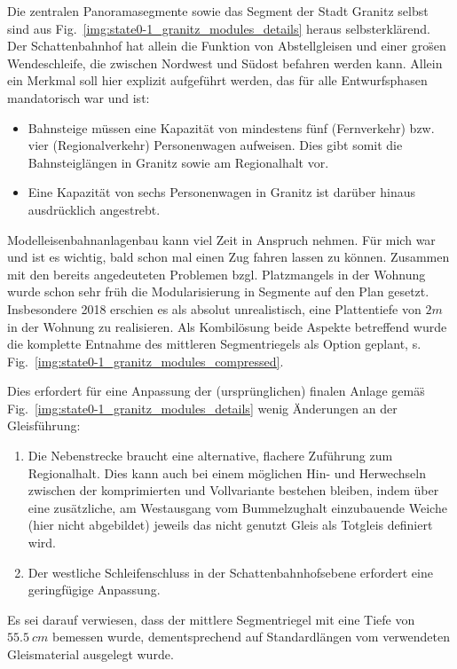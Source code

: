 Die zentralen Panoramasegmente sowie das Segment der Stadt Granitz selbst sind aus Fig.~\ref{img:state0-1_granitz_modules_details} heraus selbsterkl\"arend.
Der Schattenbahnhof hat allein die Funktion von Abstellgleisen und einer gro\"sen Wendeschleife, die zwischen Nordwest und S\"udost befahren werden kann.
Allein ein Merkmal soll hier explizit aufgef\"uhrt werden, das f\"ur alle Entwurfsphasen mandatorisch war und ist:
\begin{itemize}
	\item Bahnsteige m\"ussen eine Kapazit\"at von mindestens f\"unf (Fernverkehr) bzw. vier  (Regionalverkehr) Personenwagen aufweisen.
	Dies gibt somit die Bahnsteigl\"angen in Granitz sowie am Regionalhalt vor.
	\item Eine Kapazit\"at von sechs Personenwagen in Granitz ist dar\"uber hinaus ausdr\"ucklich angestrebt.
\end{itemize}

Modelleisenbahnanlagenbau kann viel Zeit in Anspruch nehmen.
F\"ur mich war und ist es wichtig, bald schon mal einen Zug fahren lassen zu k\"onnen.
Zusammen mit den bereits angedeuteten Problemen bzgl. Platzmangels in der Wohnung wurde schon sehr fr\"uh die Modularisierung in Segmente auf den Plan gesetzt.
Insbesondere 2018 erschien es als absolut unrealistisch, eine Plattentiefe von $2m$ in der Wohnung zu realisieren.
Als Kombil\"osung beide Aspekte betreffend wurde die komplette Entnahme des mittleren Segmentriegels als Option geplant, s. Fig.~\ref{img:state0-1_granitz_modules_compressed}.

Dies erfordert f\"ur eine Anpassung der (urspr\"unglichen) finalen Anlage gem\"a\"s Fig.~\ref{img:state0-1_granitz_modules_details} wenig \"Anderungen an der Gleisf\"uhrung:
\begin{enumerate}
	\item Die Nebenstrecke braucht eine alternative, flachere Zuf\"uhrung zum Regionalhalt.
	Dies kann auch bei einem m\"oglichen Hin- und Herwechseln zwischen der komprimierten und Vollvariante bestehen bleiben, indem \"uber eine zus\"atzliche, am Westausgang vom Bummelzughalt einzubauende Weiche (hier nicht abgebildet) jeweils das nicht genutzt Gleis als Totgleis definiert wird.
	\item Der westliche Schleifenschluss in der Schattenbahnhofsebene erfordert eine geringf\"ugige Anpassung.
\end{enumerate}
Es sei darauf verwiesen, dass der mittlere Segmentriegel mit eine Tiefe von $55.5~cm$ bemessen wurde, dementsprechend auf Standardl\"angen vom verwendeten Gleismaterial ausgelegt wurde.

